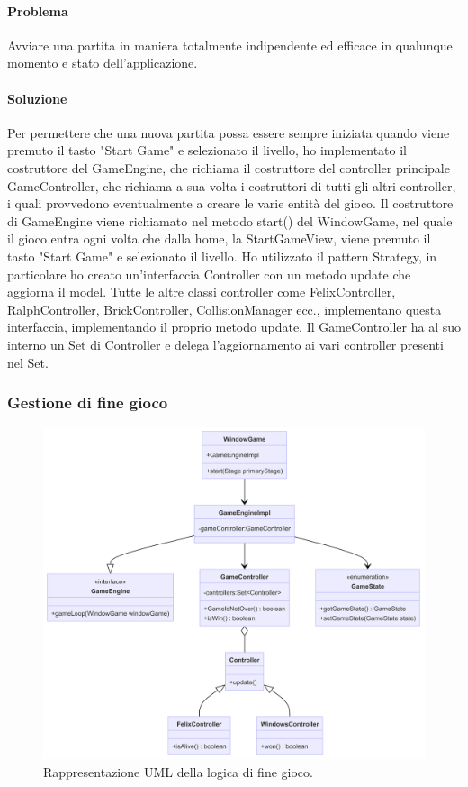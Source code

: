 \documentclass[a4paper,12pt]{report}
\begin{document}
\paragraph{Problema} Avviare una partita in maniera totalmente indipendente ed efficace in qualunque momento e stato dell’applicazione.

\paragraph{Soluzione} Per permettere che una nuova partita possa essere sempre iniziata quando viene premuto il tasto "Start Game" e selezionato il livello, ho implementato il costruttore del GameEngine, che richiama il costruttore del controller principale GameController, che richiama a sua volta i costruttori di tutti gli altri controller, i quali provvedono eventualmente a creare le varie entità del gioco. Il costruttore di GameEngine viene richiamato nel metodo start() del WindowGame, nel quale il gioco entra ogni volta che dalla home, la StartGameView, viene premuto il tasto "Start Game" e selezionato il livello. Ho utilizzato il pattern Strategy, in particolare ho creato un'interfaccia Controller con un metodo update che aggiorna il model. Tutte le altre classi controller come FelixController, RalphController, BrickController, CollisionManager ecc., implementano questa interfaccia, implementando il proprio metodo update. Il GameController ha al suo interno un Set di Controller e delega l'aggiornamento ai vari controller presenti nel Set. 

\subsubsection{Gestione di fine gioco}

\begin{figure}[H]
\centering{}
\includegraphics[width=\textwidth]{img/finegioco.png}
\caption{Rappresentazione UML della logica di fine gioco.}
\end{figure}
\end{document}
